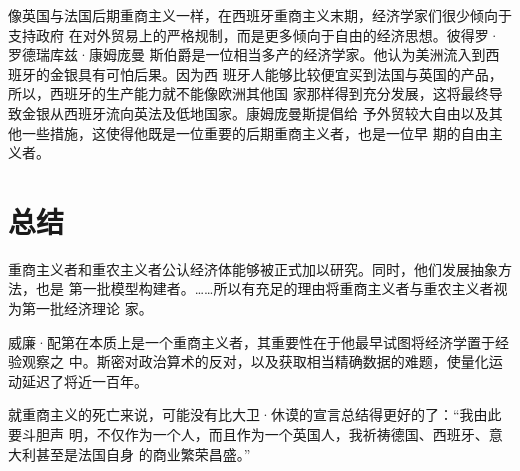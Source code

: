像英国与法国后期重商主义一样，在西班牙重商主义末期，经济学家们很少倾向于支持政府
在对外贸易上的严格规制，而是更多倾向于自由的经济思想。彼得罗·罗德瑞库兹·康姆庞曼
斯伯爵是一位相当多产的经济学家。他认为美洲流入到西班牙的金银具有可怕后果。因为西
班牙人能够比较便宜买到法国与英国的产品，所以，西班牙的生产能力就不能像欧洲其他国
家那样得到充分发展，这将最终导致金银从西班牙流向英法及低地国家。康姆庞曼斯提倡给
予外贸较大自由以及其他一些措施，这使得他既是一位重要的后期重商主义者，也是一位早
期的自由主义者。

\section{总结}

重商主义者和重农主义者公认经济体能够被正式加以研究。同时，他们发展抽象方法，也是
第一批模型构建者。……所以有充足的理由将重商主义者与重农主义者视为第一批经济理论
家。

威廉·配第在本质上是一个重商主义者，其重要性在于他最早试图将经济学置于经验观察之
中。斯密对政治算术的反对，以及获取相当精确数据的难题，使量化运动延迟了将近一百年。

就重商主义的死亡来说，可能没有比大卫·休谟的宣言总结得更好的了：“我由此要斗胆声
明，不仅作为一个人，而且作为一个英国人，我祈祷德国、西班牙、意大利甚至是法国自身
的商业繁荣昌盛。”
